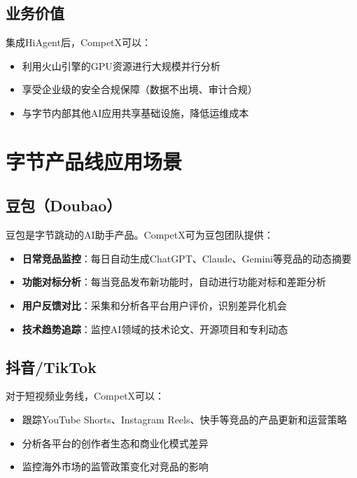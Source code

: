 \documentclass[12pt,a4paper]{ctexrep}
\begin{document}
\subsection{业务价值}

集成HiAgent后，CompetX可以：

\begin{itemize}[leftmargin=2em]
\item 利用火山引擎的GPU资源进行大规模并行分析
\item 享受企业级的安全合规保障（数据不出境、审计合规）
\item 与字节内部其他AI应用共享基础设施，降低运维成本
\end{itemize}

\section{字节产品线应用场景}

\subsection{豆包（Doubao）}

豆包\cite{doubao2025}是字节跳动的AI助手产品。CompetX可为豆包团队提供：

\begin{itemize}[leftmargin=2em]
\item \textbf{日常竞品监控}：每日自动生成ChatGPT、Claude、Gemini等竞品的动态摘要
\item \textbf{功能对标分析}：每当竞品发布新功能时，自动进行功能对标和差距分析
\item \textbf{用户反馈对比}：采集和分析各平台用户评价，识别差异化机会
\item \textbf{技术趋势追踪}：监控AI领域的技术论文、开源项目和专利动态
\end{itemize}

\subsection{抖音/TikTok}

对于短视频业务线，CompetX可以：

\begin{itemize}[leftmargin=2em]
\item 跟踪YouTube Shorts、Instagram Reels、快手等竞品的产品更新和运营策略
\item 分析各平台的创作者生态和商业化模式差异
\item 监控海外市场的监管政策变化对竞品的影响
\end{itemize}
\end{document}
